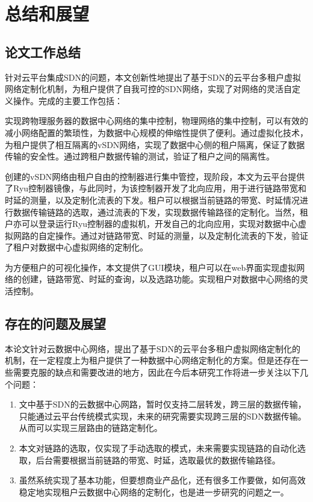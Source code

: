 \chapter{总结和展望}
\section{论文工作总结}
针对云平台集成SDN的问题，本文创新性地提出了基于SDN的云平台多租户虚拟网络定制化机制，为租户提供了自我可控的SDN网络，实现了对网络的灵活自定义操作。完成的主要工作包括：

实现跨物理服务器的数据中心网络的集中控制，物理网络的集中控制，可以有效的减小网络配置的繁琐性，为数据中心规模的伸缩性提供了便利。通过虚拟化技术，为租户提供了相互隔离的vSDN网络，实现了数据中心侧的租户隔离，保证了数据传输的安全性。通过跨租户数据传输的测试，验证了租户之间的隔离性。

创建的vSDN网络由租户自由的控制器进行集中管控，现阶段，本文为云平台提供了Ryu控制器镜像，与此同时，为该控制器开发了北向应用，用于进行链路带宽和时延的测量，以及定制化流表的下发。租户可以根据当前链路的带宽、时延情况进行数据传输链路的选取，通过流表的下发，实现数据传输路径的定制化。当然，租户亦可以登录运行Ryu控制器的虚拟机，开发自己的北向应用，实现对数据中心虚拟网路的自定操作。通过对链路带宽、时延的测量，以及定制化流表的下发，验证了租户对数据中心虚拟网络的定制化。

为方便租户的可视化操作，本文提供了GUI模块，租户可以在web界面实现虚拟网络的创建，链路带宽、时延的查询，以及选路功能。实现租户对数据中心网络的灵活控制。

\section{存在的问题及展望}
本论文针对云数据中心网络，提出了基于SDN的云平台多租户虚拟网络定制化的机制，在一定程度上为租户提供了一种数据中心网络定制化的方案。但是还存在一些需要克服的缺点和需要改进的地方，因此在今后本研究工作将进一步关注以下几个问题：

\begin{enumerate}[1)]
\item 文中基于SDN的云数据中心网路，暂时仅支持二层转发，跨三层的数据传输，只能通过云平台传统模式实现，未来的研究需要实现跨三层的SDN数据传输。从而可以实现三层路由的链路定制化。
\item 本文对链路的选取，仅实现了手动选取的模式，未来需要实现链路的自动化选取，后台需要根据当前链路的带宽、时延，选取最优的数据传输路径。
\item 虽然系统实现了基本功能，但要想商业产品化，还有很多工作要做，如何高效稳定地实现租户云数据中心网络的定制化，也是进一步研究的问题之一。
\end{enumerate}